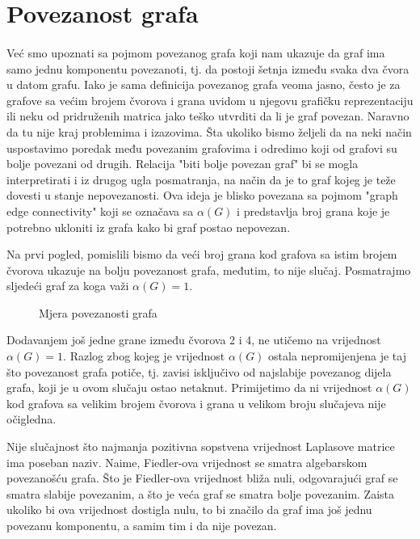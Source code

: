 \documentclass[11pt]{article}
\begin{document}
		\newpage

	\section{Povezanost grafa}
	\paragraph{}
	Već smo upoznati sa pojmom povezanog grafa koji nam ukazuje da graf ima samo jednu komponentu povezanoti, tj. da postoji šetnja između svaka dva čvora u datom grafu.
	Iako je sama definicija povezanog grafa veoma jasno, često je za grafove sa većim brojem čvorova i grana uvidom u njegovu grafičku reprezentaciju ili neku od pridruženih matrica jako teško utvrditi
	da li je graf povezan. Naravno da tu nije kraj problemima i izazovima. Šta ukoliko bismo željeli da na neki način uspostavimo poredak među povezanim grafovima i odredimo koji od grafovi su bolje povezani od drugih.
	Relacija "biti bolje povezan graf" bi se mogla interpretirati i iz drugog ugla posmatranja, na način da je to graf kojeg je teže dovesti u stanje nepovezanosti.
	Ova ideja je blisko povezana sa pojmom "graph edge connectivity" koji se označava sa $\alpha(G)$ i predstavlja broj grana koje je potrebno ukloniti iz grafa kako bi graf postao nepovezan.
	
	Na prvi pogled, pomislili bismo da veći broj grana kod grafova sa istim brojem čvorova ukazuje na bolju povezanost grafa, međutim, to nije slučaj.
	Posmatrajmo sljedeći graf za koga važi $\alpha(G)=1$.

	\begin{figure}[h]
		\centering
		\hfill
		\caption{Mjera povezanosti grafa}
	\end{figure}
	
	Dodavanjem još jedne grane između čvorova 2 i 4, ne utičemo na vrijednost $\alpha(G)=1$. Razlog zbog kojeg je vrijednost $\alpha(G)$ ostala nepromijenjena je taj što povezanost grafa potiče, tj. zavisi isključivo od najslabije povezanog dijela grafa, koji je u ovom slučaju ostao netaknut.
	Primijetimo da ni vrijednost $\alpha(G)$ kod grafova sa velikim brojem čvorova i grana u velikom broju slučajeva nije očigledna.

	Nije slučajnost što najmanja pozitivna sopstvena vrijednost Laplasove matrice ima poseban naziv. Naime, Fiedler-ova vrijednost se smatra algebarskom povezanošću grafa.
	Što je Fiedler-ova vrijednost bliža nuli, odgovarajući graf se smatra slabije povezanim, a što je veća graf se smatra bolje povezanim. 
	Zaista ukoliko bi ova vrijednost dostigla nulu, to bi značilo da graf ima još jednu povezanu komponentu, a samim tim i da nije povezan.
	
\end{document}

